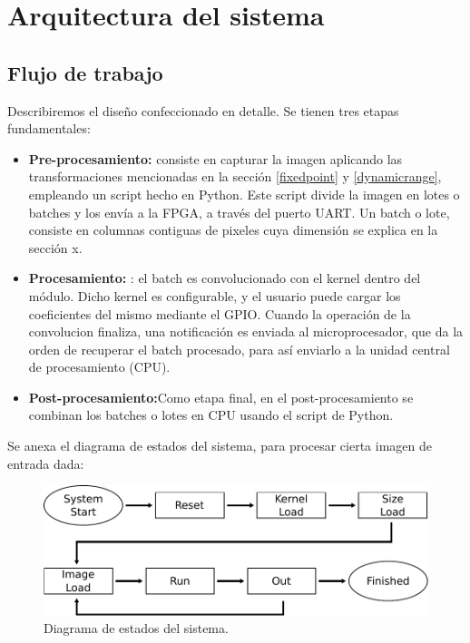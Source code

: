 \documentclass[]{IEEEphot}
\begin{document}
\section{Arquitectura del sistema}  \label{arquitectura_sec}
\subsection{Flujo de trabajo}  \label{workflow_subsecc}

Describiremos el diseño confeccionado en detalle. Se tienen tres etapas fundamentales:

\begin{itemize}
\item \textbf{Pre-procesamiento:} consiste en capturar la imagen aplicando las
  transformaciones mencionadas en la sección \ref{fixedpoint} y \ref{dynamicrange}, empleando un script hecho en Python. Este script divide la imagen en lotes o batches y los envía a la FPGA, a través del puerto UART. Un batch o lote, consiste en columnas contiguas de pixeles cuya dimensión se explica en la sección x.
\item \textbf{Procesamiento:}	: el batch es convolucionado con el kernel dentro del módulo. Dicho kernel es configurable, y el usuario puede cargar los coeficientes del mismo mediante el GPIO. 
  Cuando la operación de la convolucion finaliza, una notificación es enviada al microprocesador, que da la orden de recuperar el batch procesado, para así enviarlo a la unidad central de procesamiento (CPU).
\item \textbf{Post-procesamiento:}Como etapa final, en el post-procesamiento se combinan los batches o lotes en CPU usando el script de Python.
\end{itemize}


Se anexa el diagrama de estados del sistema, para procesar cierta imagen de entrada dada:\\

\begin{figure}[H]
\centering
\includegraphics[scale=0.7]{states.pdf}
\caption{Diagrama de estados del sistema.}
\label{statesfig}
\end{figure}
\end{document}
